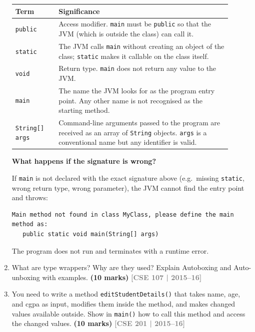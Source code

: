 \documentclass[12pt,a3paper]{article}
\newcommand{\yr}[1]{\hfill\textcolor{gray}{\small\textbf{[#1]}}}
\newcommand{\mk}[1]{\textcolor{orange!70!black}{\small\textbf{(#1 marks)}}}
\begin{document}
\begin{enumerate}
\begin{tcolorbox}[enhanced,breakable,ansbox,
  colback=cB!4,colframe=cB,boxrule=0.8pt,arc=5pt,
  title={\textbf{Answer --- Java \texttt{main} Method Prototype}},
  fonttitle=\bfseries\color{white},colbacktitle=cB]
\begin{center}
\small
\begin{tabular}{@{}p{0.18\linewidth}p{0.72\linewidth}@{}}
\toprule
\textbf{Term} & \textbf{Significance} \\
\midrule
\texttt{public} &
  Access modifier.  \texttt{main} must be \texttt{public} so that
  the JVM (which is outside the class) can call it. \\[4pt]
\texttt{static} &
  The JVM calls \texttt{main} without creating an object of the
  class; \texttt{static} makes it callable on the class itself. \\[4pt]
\texttt{void} &
  Return type.  \texttt{main} does not return any value to the JVM. \\[4pt]
\texttt{main} &
  The name the JVM looks for as the program entry point.  Any other
  name is not recognised as the starting method. \\[4pt]
\texttt{String[] args} &
  Command-line arguments passed to the program are received as an
  array of \texttt{String} objects.  \texttt{args} is a conventional
  name but any identifier is valid. \\
\bottomrule
\end{tabular}
\end{center}

\textbf{What happens if the signature is wrong?}

If \texttt{main} is not declared with the exact signature above
(e.g.\ missing \texttt{static}, wrong return type, wrong parameter),
the JVM cannot find the entry point and throws:
\begin{lstlisting}
Main method not found in class MyClass, please define the main method as:
   public static void main(String[] args)
\end{lstlisting}
The program does not run and terminates with a runtime error.

\end{tcolorbox}

\item What are type wrappers? Why are they used? Explain Autoboxing and Auto-unboxing with examples. \mk{10}
\yr{CSE 107 | 2015--16}

\item You need to write a method \texttt{editStudentDetails()} that takes name, age, and cgpa as input, modifies them inside the method, and makes changed values available outside. Show in \texttt{main()} how to call this method and access the changed values. \mk{10}
\yr{CSE 201 | 2015--16}


\end{enumerate}
\end{document}
